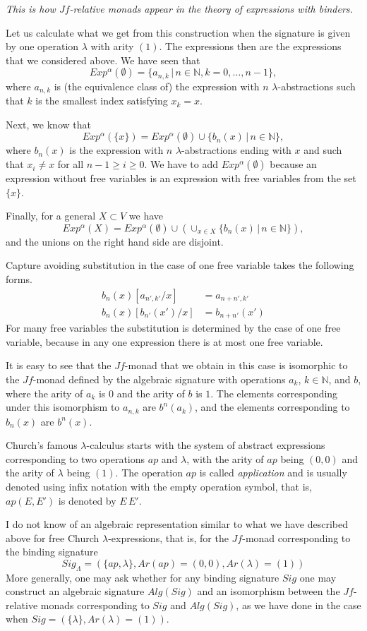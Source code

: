 \documentclass[12pt]{amsart}
\numberwithin{proposition}{subsection}
\newcommand{\nn}{{\mathbb N}}
\newcommand{\nat}{\nn}
\begin{document}
{\em This is how $Jf$-relative monads appear in the theory of expressions with binders.}

Let us calculate what we get from this construction when the signature is given
by one operation $\lambda$ with arity $(1)$. The expressions then are the
expressions that we considered above. We have seen that
%
$$Exp^{\alpha}(\emptyset)=\{a_{n,k}\,|\,n\in\nat,k=0,\dots,n-1\},$$
%
where $a_{n,k}$ is (the equivalence class of) the expression with $n$
$\lambda$-abstractions such that $k$ is the smallest index satisfying $x_k=x$.

Next, we know that
%
$$Exp^{\alpha}(\{x\})=Exp^{\alpha}(\emptyset)\cup \{b_n(x)\,|\,n\in \nat\},$$
%
where $b_n(x)$ is the expression with $n$ $\lambda$-abstractions ending with
$x$ and such that $x_i\ne x$ for all $n-1\ge i\ge 0$. We have to add
$Exp^{\alpha}(\emptyset)$ because an expression without free variables is an
expression with free variables from the set $\{x\}$.

Finally, for a general $X\subset V$ we have
%
$$Exp^{\alpha}(X)=Exp^{\alpha}(\emptyset)\cup (\cup_{x\in X}\{b_n(x)\,|\,n\in \nat\}),$$
%
and the unions on the right hand side are disjoint. 

Capture avoiding substitution in the case of one free variable takes the following forms.
%
\begin{align}
b_n(x)[a_{n',k'}/x]&=a_{n+n',k'}\\
b_n(x)[b_{n'}(x')/x]&=b_{n+n'}(x')
\end{align}
%
For many free variables the substitution is determined by the case of one free
variable, because in any one expression there is at most one free variable.

It is easy to see that the $Jf$-monad that we obtain in this case is isomorphic
to the $Jf$-monad defined by the algebraic signature with operations $a_k$,
$k\in\nat$, and $b$, where the arity of $a_k$ is $0$ and the arity of $b$ is
$1$. The elements corresponding under this isomorphism to $a_{n,k}$ are
$b^n(a_k)$, and the elements corresponding to $b_n(x)$ are $b^n(x)$.

Church's famous $\lambda$-calculus starts with the system of abstract
expressions corresponding to two operations $ap$ and $\lambda$, with the arity
of $ap$ being $(0,0)$ and the arity of $\lambda$ being $(1)$.  The operation $ap$ is
called {\em application} and is usually denoted using infix notation with the
empty operation symbol, that is, $ap(E,E')$ is denoted by $E\,E'$.

I do not know of an algebraic representation similar to what we have described
above for free Church $\lambda$-expressions, that is, for the $Jf$-monad
corresponding to the binding signature
%
$$Sig_{\Lambda}=(\{ap,\lambda\}, Ar(ap)=(0,0), Ar(\lambda)=(1))$$
%
More generally, one may ask whether for any binding signature $Sig$ one may
construct an algebraic signature $Alg(Sig)$ and an isomorphism between the
$Jf$-relative monads corresponding to $Sig$ and $Alg(Sig)$, as we have done in
the case when $Sig=(\{\lambda\},Ar(\lambda)=(1))$.
\end{document}
